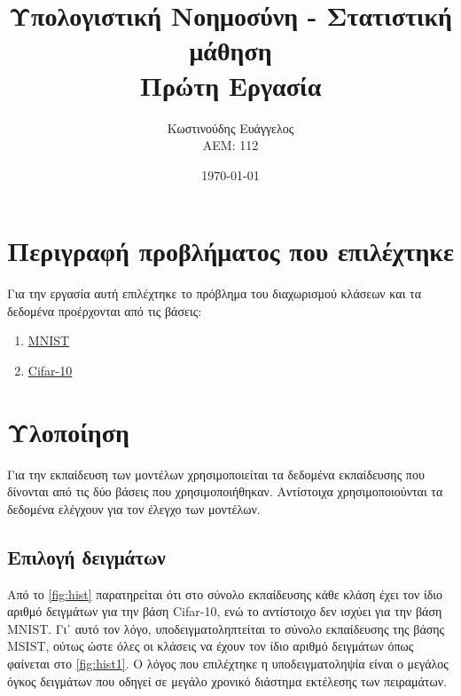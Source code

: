 \documentclass[a4paper]{article}
\title{Υπολογιστική Νοημοσύνη - Στατιστική μάθηση \\ Πρώτη Εργασία}
\author{Κωστινούδης Ευάγγελος \\ΑΕΜ: 112}
\date{\today}
\begin{document}
\maketitle
{}
\newpage
{}

\section{Περιγραφή προβλήματος που επιλέχτηκε}

Για την εργασία αυτή επιλέχτηκε το πρόβλημα του διαχωρισμού κλάσεων και τα
δεδομένα προέρχονται από τις βάσεις:

\begin{enumerate}
\item \href{http://yann.lecun.com/exdb/mnist/}{MNIST}
\item \href{https://www.cs.toronto.edu/~kriz/cifar.html}{Cifar-10}
\end{enumerate}


\section{Υλοποίηση}

Για την εκπαίδευση των μοντέλων χρησιμοποιείται τα δεδομένα εκπαίδευσης που
δίνονται από τις δύο βάσεις που χρησιμοποιήθηκαν. Αντίστοιχα χρησιμοποιούνται τα
δεδομένα ελέγχουν για τον έλεγχο των μοντέλων.

\subsection{Επιλογή δειγμάτων}

Από το \autoref{fig:hist} παρατηρείται ότι στο σύνολο εκπαίδευσης κάθε κλάση έχει
τον ίδιο αριθμό δειγμάτων για την βάση Cifar-10, ενώ το αντίστοιχο δεν ισχύει
για την βάση MNIST. Γι᾽ αυτό τον λόγο, υποδειγματοληπτείται το σύνολο
εκπαίδευσης της βάσης MSIST, ούτως ώστε όλες οι κλάσεις να έχουν τον ίδιο αριθμό
δειγμάτων όπως φαίνεται στο \autoref{fig:hist1}. Ο λόγος που επιλέχτηκε η
υποδειγματοληψία είναι ο μεγάλος όγκος δειγμάτων που οδηγεί σε μεγάλο χρονικό
διάστημα εκτέλεσης των πειραμάτων.
\end{document}
